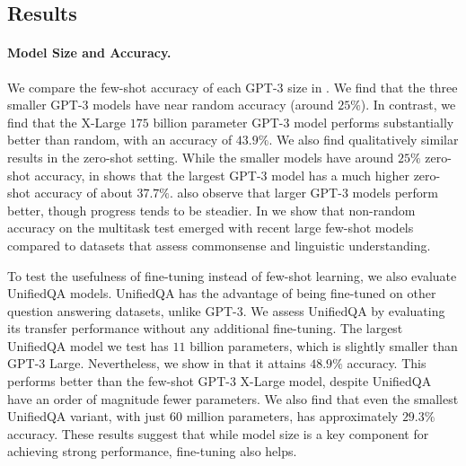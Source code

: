 \subsection{Results}

\paragraph{Model Size and Accuracy.}

We compare the few-shot accuracy of each GPT-3 size in . We find that the three smaller GPT-3 models have near random accuracy (around $25\%$). %
In contrast, we find that the X-Large $175$ billion parameter GPT-3 model performs substantially better than random, with an accuracy of $43.9\%$. We also find qualitatively similar results in the zero-shot setting. While the smaller models have around $25\%$ zero-shot accuracy,  in  shows that the largest GPT-3 model has a much higher zero-shot accuracy of about $37.7\%$. \citet{brown2020gpt3} also observe that larger GPT-3 models perform better, though progress tends to be steadier. In  we show that non-random accuracy on the multitask test emerged with recent large few-shot models compared to datasets that assess commonsense and linguistic understanding.



To test the usefulness of fine-tuning instead of few-shot learning, we also evaluate UnifiedQA models. 
UnifiedQA has the advantage of being fine-tuned on other question answering datasets, unlike GPT-3. We assess UnifiedQA 
by evaluating its transfer performance without any additional fine-tuning. The largest UnifiedQA model we test has $11$ billion parameters, which is slightly smaller than GPT-3 Large. Nevertheless, we show in  that it attains $48.9\%$ accuracy. This performs better than the few-shot GPT-3 X-Large model, despite UnifiedQA have an order of magnitude fewer parameters. We also find that even the smallest UnifiedQA variant, with just $60$ million parameters, has approximately $29.3\%$ accuracy.
These results suggest that while model size is a key component for achieving strong performance, fine-tuning also helps.%

